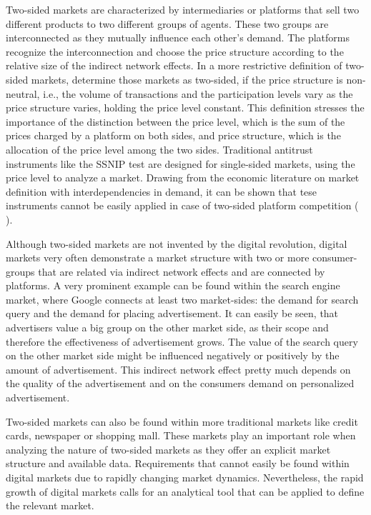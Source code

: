 \documentclass[10pt,a4paper]{scrreprt}
\begin{document}
Two-sided markets are characterized by intermediaries or platforms that sell two different products to two different groups of agents.  These two groups are interconnected as they mutually influence each other’s demand. The platforms recognize the interconnection and choose the price structure according to the relative size of the indirect network effects. In a more restrictive definition of two-sided markets, \cite{rochet_platform_2003} determine those markets as two-sided, if the price structure is non-neutral, i.e., the volume of transactions and the participation levels vary as the price structure varies, holding the price level constant. This definition stresses the importance of the distinction between the price level, which is the sum of the prices charged by a platform on both sides, and price structure, which is the allocation of the price level among the two sides. Traditional antitrust instruments like the SSNIP test are designed for single-sided markets, using the price level to analyze a market. Drawing from the economic literature on market definition with interdependencies in demand, it can be shown that tese instruments cannot be easily applied in case of two-sided platform competition (\cite{noel_analyzing_2005} \cite{filistrucchi_market_2013}).

Although two-sided markets are not invented by the digital revolution, digital markets very often demonstrate a market structure with two or more consumer-groups that are related via indirect network effects and are connected by platforms. A very prominent example can be found within the search engine market, where Google connects at least two market-sides: the demand for search query and the demand for placing advertisement. It can easily be seen, that advertisers value a big group on the other market side, as their scope and therefore the effectiveness of advertisement grows. The value of the search query on the other market side might be influenced negatively or positively by the amount of advertisement. This indirect network effect pretty much depends on the quality of the advertisement and on the consumers demand on personalized advertisement.

Two-sided markets can also be found within more traditional markets like credit cards, newspaper or shopping mall. These markets play an important role when analyzing the nature of two-sided markets as they offer an explicit market structure and available data. Requirements that cannot easily be found within digital markets due to rapidly changing market dynamics. Nevertheless, the rapid growth of digital markets calls for an analytical tool that can be applied to define the relevant market.
\end{document}
